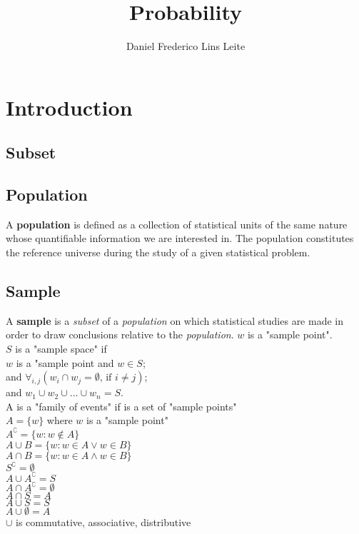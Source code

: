 \documentclass[10pt,a4paper]{book}
\author{Daniel Frederico Lins Leite}
\title{Probability}
\newcommand\tab[1][1cm]{\hspace*{#1}}
\begin{document}
	\section{Introduction}
	\subsection{Subset}
	
	\subsection{Population}
	A \textbf{population} is defined as a collection of statistical units of the same nature whose quantifiable information we are interested in. The 	population constitutes the reference universe during the study of a given statistical problem.
	\subsection {Sample}
	A \textbf{sample} is a \textit{subset} of a \textit{population} on which statistical studies are made in order to draw conclusions relative to the \textit{population}.
	$w$ is a "sample point".\\
	$S$ is a "sample space" if\\
		\tab $w$ is a "sample point and $w \in S$;\\
		\tab and $\forall_{i,j}{(w_i \cap w_j = \emptyset \text{, if } i \neq j)}$;\\
		\tab and $w_1 \cup w_2 \cup ... \cup w_n = S$.\\
		A is a "family of events" if is a set of "sample points"\\
		\tab $A = \{w\}$ where $w$ is a "sample point"\\
		\tab $A^\complement = \{w : w \notin A\}$\\
		\tab $A \cup B = \{w: w \in A \lor w \in B\}$\\
		\tab $A \cap B = \{w: w \in A \land w \in B\}$\\
		\tab $S^\complement = \emptyset$\\
		\tab $A \cup A^\complement = S$\\
		\tab $A \cap A^\complement = \emptyset$\\
		\tab $A \cap S = A$\\
		\tab $A \cup S = S$\\
		\tab $A \cup \emptyset = A$\\
		\tab $\cup$ is commutative, associative, distributive\\
\end{document}
